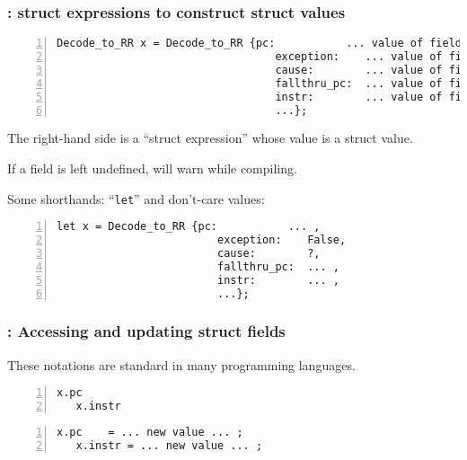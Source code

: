 \begin{frame}[fragile]
\frametitle{{\BSV}: struct expressions to construct struct values}

\footnotesize

\begin{Verbatim}[frame=single, numbers=left]
   Decode_to_RR x = Decode_to_RR {pc:           ... value of field ... ,
                                  exception:    ... value of field ... ,
                                  cause:        ... value of field ... ,
                                  fallthru_pc:  ... value of field ... ,
                                  instr:        ... value of field ... ,
                                  ...};
\end{Verbatim}
The right-hand side is a ``struct expression'' whose value is a struct value.

\vspace{1ex}

If a field is left undefined, {\bsc} will warn while compiling.

\PAUSE{\vspace*{4ex}}

Some shorthands: ``{\tt let}'' and don't-care values:

\vspace*{2ex}

\begin{Verbatim}[frame=single, numbers=left]
   let x = Decode_to_RR {pc:           ... ,
                         exception:    False,
                         cause:        ?,
                         fallthru_pc:  ... ,
                         instr:        ... ,
                         ...};
\end{Verbatim}

\end{frame}


\begin{frame}[fragile]
\frametitle{{\BSV}: Accessing and updating struct fields}

\footnotesize

These notations are standard in many programming languages.

\vspace{5ex}

\begin{Verbatim}[frame=single, numbers=left]
   x.pc
   x.instr
\end{Verbatim}

\vspace{5ex}

\begin{Verbatim}[frame=single, numbers=left]
   x.pc    = ... new value ... ;
   x.instr = ... new value ... ;
\end{Verbatim}

\end{frame}


